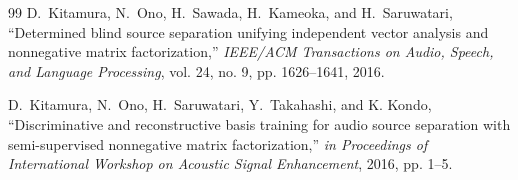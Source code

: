 \documentclass[honka]{nitkcthesis}%
\begin{document}

\makeseparatedabstract %

{\makeatletter
\let\ps@jpl@in\ps@empty
\makeatother
\pagestyle{empty}
\setcounter{tocdepth}{3}
\tableofcontents
\clearpage}

\mainmatter







\backmatter



\begin{thebibliography}{99}
    D.~Kitamura, N.~Ono, H.~Sawada, H.~Kameoka, and H.~Saruwatari, 
    ``Determined blind source separation unifying independent vector analysis and nonnegative matrix factorization,''
    \emph{IEEE/ACM Transactions on Audio, Speech, and Language Processing}, vol. 24, no. 9, pp. 1626--1641, 2016.

    D.~Kitamura, N.~Ono, H.~Saruwatari, Y.~Takahashi, and K. Kondo, 
    ``Discriminative and reconstructive basis training for audio source separation with semi-supervised nonnegative matrix factorization,''
    \emph{in Proceedings of International Workshop on Acoustic Signal Enhancement}, 2016, pp. 1--5.
\end{thebibliography}

% 



\appendix


\end{document}
